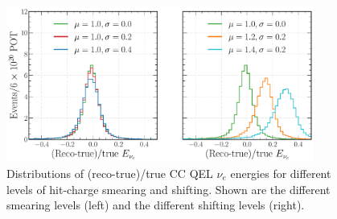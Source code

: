 \begin{table} %
     \caption[Classification performance metrics for different levels of hit-charge smearing and
    shifting] {Classification performance metrics for different levels of hit-charge smearing and
    shifting. The highest scoring values for each metric are indicated in bold. The given errors
    correspond to the statistical uncertainty only.}
    \label{tab:calib_charge}
\end{table}

\begin{figure} %
    \includegraphics[width=0.9\textwidth]{diagrams/7-results/calib_charge_energy.pdf}
    \caption[Distributions of (reco-true)/true $\nu_{e}$ energies for different levels of
        hit-charge smearing and shifting] {Distributions of (reco-true)/true CC QEL $\nu_{e}$
        energies for different levels of hit-charge smearing and shifting. Shown are the different
        smearing levels (left) and the different shifting levels (right).}
    \label{fig:calib_charge_energy}
\end{figure}

